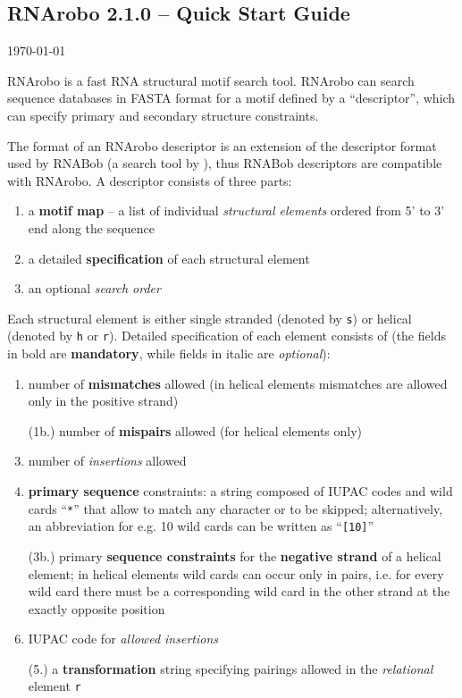 \documentclass[11pt]{article}
\begin{document}


\begin{center}
\section*{RNArobo 2.1.0 -- Quick Start Guide}
\today
\end{center}

RNArobo is a fast RNA structural motif search tool. RNArobo can search sequence databases in FASTA format for a motif defined by a ``descriptor'', which can specify primary and secondary structure constraints.

The format of an RNArobo descriptor is an extension of the descriptor format used by RNABob (a search tool by \citet{eddy1996}), thus RNABob descriptors are compatible with RNArobo. A descriptor consists of three parts:
\begin{enumerate}
\item a \textbf{motif map} -- a list of individual \emph{structural elements}
  ordered from 5' to 3' end along the sequence
\item a detailed \textbf{specification} of each structural element
\item an optional \emph{search order}
\end{enumerate}
Each structural element is either single stranded (denoted by \texttt{s}) or helical (denoted by \texttt{h} or \texttt{r}). Detailed specification of each element consists of (the fields in bold are \textbf{mandatory}, while fields in italic are \emph{optional}):
\begin{enumerate}
\item number of \textbf{mismatches} allowed (in helical elements mismatches are allowed only in the positive strand)
\item[(1b.)] number of \textbf{mispairs} allowed (for helical elements only)
\item number of \emph{insertions} allowed
\item \textbf{primary sequence} constraints: a string composed of IUPAC codes and wild cards ``\texttt{*}'' that allow to match any character or to be skipped; alternatively, an abbreviation for e.g. 10 wild cards can be written as ``\texttt{[10]}''
\item[(3b.)] primary \textbf{sequence constraints} for the \textbf{negative strand} of a helical element; in helical elements wild cards can occur only in pairs, i.e. for every wild card there must be a corresponding wild card in the other strand at the exactly opposite position
\item IUPAC code for \emph{allowed insertions}
\item[(5.)] a \textbf{transformation} string specifying pairings allowed in the \emph{relational} element \texttt{r} 
\end{enumerate}
\end{document}
